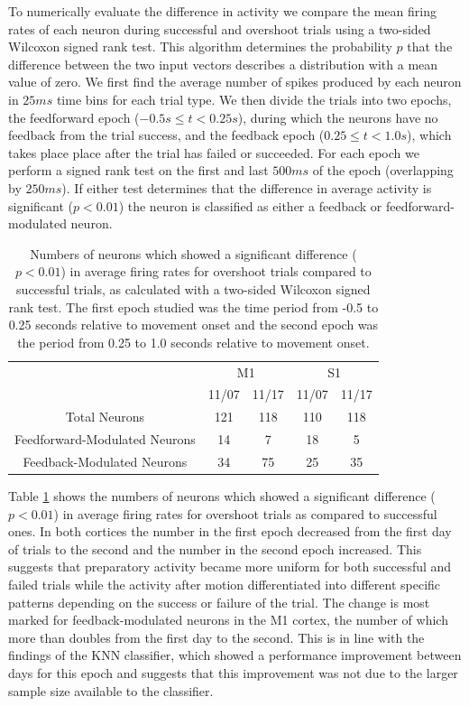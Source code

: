 \documentclass[11pt,a4paper]{article}
\begin{document}
To numerically evaluate the difference in activity we compare the mean firing rates of each neuron during successful and overshoot trials using a two-sided Wilcoxon signed rank test. This algorithm determines the probability $p$ that the difference between the two input vectors describes a distribution with a mean value of zero. We first find the average number of spikes produced by each neuron in $25ms$ time bins for each trial type. We then divide the trials into two epochs, the feedforward epoch ($-0.5s \leq t < 0.25s$), during which the neurons have no feedback from the trial success, and the feedback epoch ($0.25 \leq t < 1.0s$), which takes place place after the trial has failed or succeeded. For each epoch we perform a signed rank test on the first and last $500ms$ of the epoch (overlapping by $250ms$). If either test determines that the difference in average activity is significant ($p<0.01$) the neuron is classified as either a feedback or feedforward-modulated neuron. 

\begin{table}[h]
\begin{tabular}{|c|c|c|c|c|}
\hline 
 & \multicolumn{2}{c|}{M1} & \multicolumn{2}{c|}{S1} \\ 
\cline{2-5}
 & 11/07 & 11/17 & 11/07 & 11/17 \\ 
\hline 
Total Neurons & 121 & 118 & 110 & 118 \\ 
\hline 
Feedforward-Modulated Neurons & 14 & 7 & 18 & 5 \\ 
\hline 
Feedback-Modulated Neurons & 34 & 75 & 25 & 35 \\ 
\hline 
\end{tabular} 
\caption{Numbers of neurons which showed a significant difference ($p<0.01$) in average firing rates for overshoot trials compared to successful trials, as calculated with a two-sided Wilcoxon signed rank test. The first epoch studied was the time period from -0.5 to 0.25 seconds relative to movement onset and the second epoch was the period from 0.25 to 1.0 seconds relative to movement onset.}\label{table:signrank}
\end{table}

Table \ref{table:signrank} shows the numbers of neurons which showed a significant difference ($p<0.01$) in average firing rates for overshoot trials as compared to successful ones. In both cortices the number in the first epoch decreased from the first day of trials to the second and the number in the second epoch increased. This suggests that preparatory activity became more uniform for both successful and failed trials while the activity after motion differentiated into different specific patterns depending on the success or failure of the trial. The change is most marked for feedback-modulated neurons in the M1 cortex, the number of which more than doubles from the first day to the second. This is in line with the findings of the KNN classifier, which showed a performance improvement between days for this epoch and suggests that this improvement was not due to the larger sample size available to the classifier.
\end{document}
